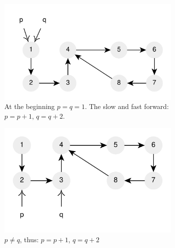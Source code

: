 \begin{figure}
	\vspace*{-0.5in}
	\centering
	\begin{subfigure}[t]{0.36\textwidth}
		\includegraphics[width=1\linewidth]{sources/cycle_in_list/images/floyd1}
		\caption{At the beginning $p=q=1$. The slow and fast forward: $p=p+1$, $q=q+2$.}
		\label{fig:cycle_in_list:floyd1}
	 \end{subfigure}
	\hfill
	\begin{subfigure}[t]{0.36\textwidth}
		\includegraphics[width=1\linewidth]{sources/cycle_in_list/images/floyd2}
		\caption{$p \neq q$,  thus: $p=p+1$, $q=q+2$}
		\label{fig:cycle_in_list:floyd2}
	 \end{subfigure}
	 \hfill
	 \begin{subfigure}[l]{0.36\textwidth}

\end{subfigure}
\end{figure}
